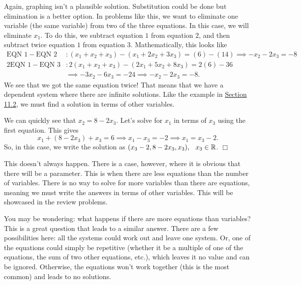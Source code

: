 \documentclass[../book.tex]{subfiles}
\begin{document}
\begin{solution}
Again, graphing isn't a plausible solution.  Substitution could be done but elimination is a better option.  In problems like this, we want to eliminate one variable (the same variable) from two of the three equations.  In this case, we will eliminate $x_1$.  To do this, we subtract equation $1$ from equation $2$, and then subtract twice equation $1$ from equation $3$.  Mathematically, this looks like \begin{align*}
    \text{EQN } 1 - \text{EQN } 2&: (x_1+x_2+x_3)-(x_1+2x_2+3x_3)=(6)-(14) \implies -x_2-2x_3=-8\\
    2\text{EQN } 1 - \text{EQN } 3&: 2(x_1+x_2+x_3)-(2x_1+5x_2+8x_3)=2(6)-36 \\
    &\implies -3x_2-6x_3=-24 \implies -x_2-2x_3=-8.
\end{align*}
We see that we got the same equation twice!  That means that we have a dependent system where there are infinite solutions.  Like the example in \hyperlink{section.11.2}{Section 11.2}, we must find a solution in terms of other variables.

We can quickly see that $x_2=8-2x_3$.  Let's solve for $x_1$ in terms of $x_3$ using the first equation.  This gives $$x_1+(8-2x_3)+x_3=6 \implies x_1-x_3=-2 \implies x_1=x_3-2.$$  So, in this case, we write the solution as $(x_3-2,8-2x_3,x_3), \hspace{0.10in} x_3\in\mathbb{R}$.  $\Box$
\end{solution}
This doesn't always happen.  There is a case, however, where it is obvious that there will be a parameter.  This is when there are less equations than the number of variables.  There is no way to solve for more variables than there are equations, meaning we must write the answers in terms of other variables.  This will be showcased in the review problems.

\begin{remark}
You may be wondering: what happens if there are more equations than variables?  This is a great question that leads to a similar answer.  There are a few possibilities here: all the systems could work out and leave one system.  Or, one of the equations could simply be repetitive (whether it be a multiple of one of the equations, the sum of two other equations, etc.), which leaves it no value and can be ignored.  Otherwise, the equations won't work together (this is the most common) and leads to no solutions.
\end{remark}
\end{document}
